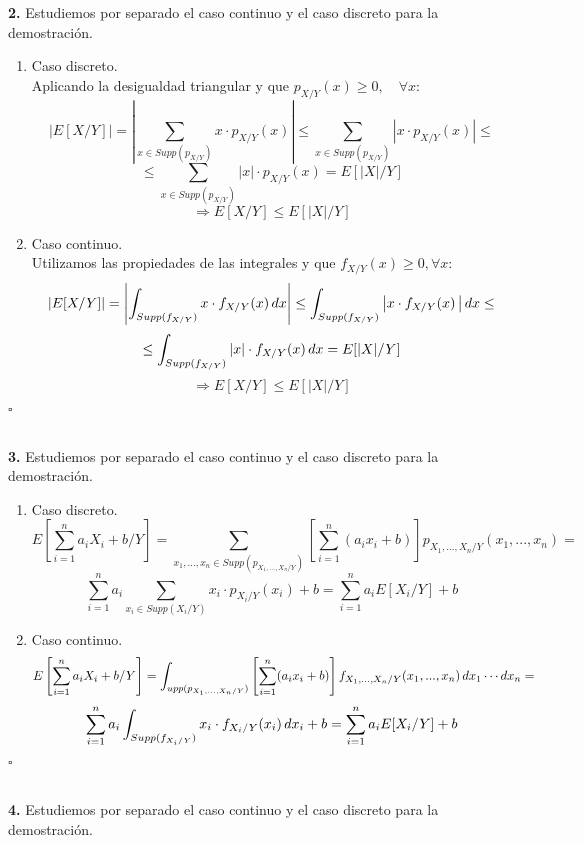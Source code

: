 \documentclass[fleqn]{article}
\newcommand*{\QED}{\hfill\ensuremath{\square}}
\begin{document}
    \newpage

    \textbf{2. } Estudiemos por separado el caso continuo y el caso discreto para la demostración.

    \begin{enumerate}
        \item Caso discreto. \\
                Aplicando la desigualdad triangular y que $p_{X/Y}(x) \geq 0, \quad \forall x:$
                $$\left| E[X/Y] \right| = \left| \sum_{x\in Supp(p_{X/Y})} x\cdot p_{X/Y}(x) \right| \leq   \sum_{x\in Supp(p_{X/Y})} \left| x\cdot p_{X/Y}(x) \right| \leq $$
                $$\leq \sum_{x\in Supp(p_{X/Y})} \left| x \right| \cdot p_{X/Y}(x) = E[|X|/Y]$$
                $$\Rightarrow E[X/Y] \leq E[|X|/Y]$$
        \item Caso continuo. \\
                Utilizamos las propiedades de las integrales y que $f_{X/Y}(x)\geq 0, \forall x :$
                $$\left| E[X/Y] \right| = \left| \int_{Supp(f_{X/Y})} x\cdot f_{X/Y}(x) \thinspace dx \right| \leq  \int_{Supp(f_{X/Y})} \left|x\cdot f_{X/Y}(x) \thinspace \right|dx  \leq$$
                $$\leq \int_{Supp(f_{X/Y})} \left| x \right|\cdot f_{X/Y}(x) \thinspace dx = E[|X|/Y]$$
                $$\Rightarrow E[X/Y] \leq E[|X|/Y]$$
    \end{enumerate}
    \QED \\ \\

    \newpage

    \textbf{3. } Estudiemos por separado el caso continuo y el caso discreto para la demostración.

    \begin{enumerate}
        \item Caso discreto. \\
                $$E\left[\sum_{i=1}^n a_iX_i +b /Y\right] = \sum_{x_1, ..., x_n \in Supp(p_{X_1,...,X_n/Y})} \left[\sum_{i=1}^n (a_ix_i + b)\right]p_{X_1,...,X_n/Y}(x_1,...,x_n) = $$
                $$\sum_{i=1}^n a_i \sum_{x_i \in Supp(X_i/Y)} x_i \cdot p_{X_i/Y}(x_i) + b = \sum_{i=1}^n a_i E[X_i/Y] +b$$
        \item Caso continuo. \\
                $$E\left[\sum_{i=1}^n a_iX_i +b /Y\right] = \int_{ upp(p_{X_1,...,X_n/Y})} \left[\sum_{i=1}^n (a_ix_i + b)\right]f_{X_1,...,X_n/Y}(x_1,...,x_n) \thinspace dx_1 \cdots dx_n= $$
                $$\sum_{i=1}^n a_i \int_{Supp(f_{X_i/Y})} x_i \cdot f_{X_i/Y}(x_i) \thinspace dx_i + b = \sum_{i=1}^n a_i E[X_i/Y] +b$$
    \end{enumerate}
    \QED \\ \\

    \newpage

    \textbf{4. } Estudiemos por separado el caso continuo y el caso discreto para la demostración.



    
    
\end{document}
